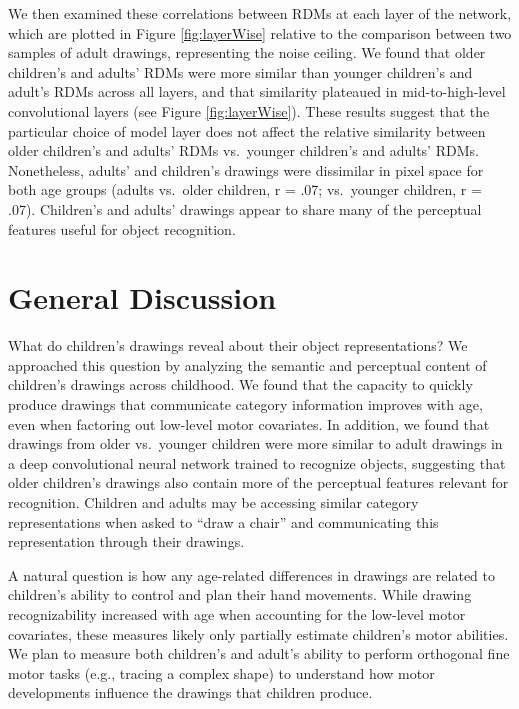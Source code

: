 \documentclass[10pt, letterpaper]{article}
\begin{document}
We then examined these correlations between RDMs at each layer of the
network, which are plotted in Figure \ref{fig:layerWise} relative to the
comparison between two samples of adult drawings, representing the noise
ceiling. We found that older children's and adults' RDMs were more
similar than younger children's and adult's RDMs across all layers, and
that similarity plateaued in mid-to-high-level convolutional layers (see
Figure \ref{fig:layerWise}). These results suggest that the particular
choice of model layer does not affect the relative similarity between
older children's and adults' RDMs vs.~younger children's and adults'
RDMs. Nonetheless, adults' and children's drawings were dissimilar in
pixel space for both age groups (adults vs.~older children, r = .07;
vs.~younger children, r = .07). Children's and adults' drawings appear
to share many of the perceptual features useful for object recognition.

\section{General Discussion}\label{general-discussion}

What do children's drawings reveal about their object representations?
We approached this question by analyzing the semantic and perceptual
content of children's drawings across childhood. We found that the
capacity to quickly produce drawings that communicate category
information improves with age, even when factoring out low-level motor
covariates. In addition, we found that drawings from older vs.~younger
children were more similar to adult drawings in a deep convolutional
neural network trained to recognize objects, suggesting that older
children's drawings also contain more of the perceptual features
relevant for recognition. Children and adults may be accessing similar
category representations when asked to ``draw a chair'' and
communicating this representation through their drawings.

A natural question is how any age-related differences in drawings are
related to children's ability to control and plan their hand movements.
While drawing recognizability increased with age when accounting for the
low-level motor covariates, these measures likely only partially
estimate children's motor abilities. We plan to measure both children's
and adult's ability to perform orthogonal fine motor tasks (e.g.,
tracing a complex shape) to understand how motor developments influence
the drawings that children produce.
\end{document}
